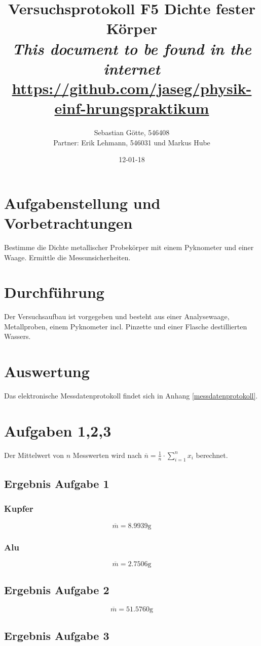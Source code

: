 \documentclass[12pt,a4paper,notitlepage]{article}
\title{Versuchsprotokoll F5 Dichte fester Körper\\
\small\emph{This document to be found in the internet}\\
\url{https://github.com/jaseg/physik-einf-hrungspraktikum}}
\author{Sebastian Götte, 546408\\
Partner: Erik Lehmann, 546031 und Markus Hube}
\date{12-01-18}
\begin{document}
\maketitle
\section{Aufgabenstellung und Vorbetrachtungen}
Bestimme die Dichte metallischer Probekörper mit einem Pyknometer und einer Waage. Ermittle die Messunsicherheiten.
\section{Durchführung}
Der Versuchsaufbau ist vorgegeben und besteht aus einer Analysewaage, Metallproben, einem Pyknometer incl. Pinzette und einer Flasche destillierten Wassers.
\section{Auswertung}
Das elektronische Messdatenprotokoll findet sich in Anhang \ref{messdatenprotokoll}.

\section{Aufgaben 1,2,3}
Der Mittelwert von $n$ Messwerten wird nach $\overline n=\frac{1}{n}\cdot\sum_{i=1}^nx_i$ berechnet.
\subsection{Ergebnis Aufgabe 1}
\subsubsection{Kupfer}
\begin{equation}
\overline m=8.9939\mathrm{g}
\end{equation}
\subsubsection{Alu}
\begin{equation}
\overline m=2.7506\mathrm{g}
\end{equation}
\subsection{Ergebnis Aufgabe 2}
\begin{equation}
\overline m=51.5760\mathrm{g}
\end{equation}
\subsection{Ergebnis Aufgabe 3}
\end{document}
